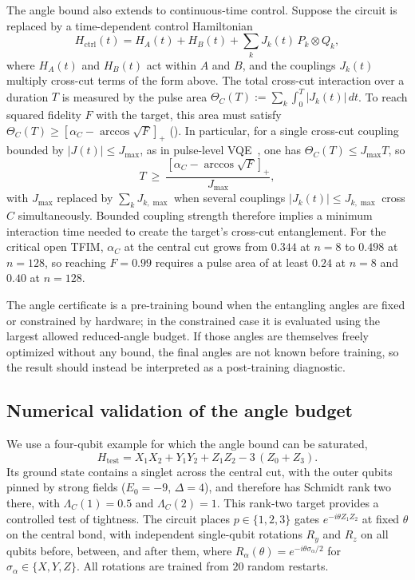 \documentclass[reprint,aps,pra,floatfix,superscriptaddress,nofootinbib,longbibliography]{revtex4-2}
\theoremstyle{remark}
\theoremstyle{definition}
\begin{document}
The angle bound also extends to continuous-time control. Suppose the circuit is
replaced by a time-dependent control Hamiltonian
\begin{equation}
  H_{\mathrm{ctrl}}(t)=H_A(t)+H_B(t)+\sum_kJ_k(t)\,P_k\otimes Q_k ,
\end{equation}
where $H_A(t)$ and $H_B(t)$ act within $A$ and $B$, and the couplings $J_k(t)$
multiply cross-cut terms of the form above. The total cross-cut interaction over
a duration $T$ is measured by the pulse area
$\Theta_C(T):=\sum_k\int_0^T|J_k(t)|\,dt$. To reach squared fidelity $F$ with the
target, this area must satisfy $\Theta_C(T)\ge[\alpha_C-\arccos\sqrt{F}]_+$
(). In particular, for a single cross-cut coupling bounded by
$|J(t)|\le J_{\max}$, as in pulse-level VQE~\cite{meitei2021gatefree}, one has
$\Theta_C(T)\le J_{\max}T$, so
\begin{equation}
  \label{eq:pulsetime}
  T\ \ge\ \frac{[\alpha_C-\arccos\sqrt{F}]_+}{J_{\max}},
\end{equation}
with $J_{\max}$ replaced by $\sum_kJ_{k,\max}$ when several couplings
$|J_k(t)|\le J_{k,\max}$ cross $C$ simultaneously. Bounded coupling strength therefore implies a minimum interaction time needed
to create the target's cross-cut entanglement.
For the critical open TFIM, $\alpha_C$ at the
central cut grows from $0.344$ at $n=8$ to $0.498$ at $n=128$, so reaching
$F=0.99$ requires a pulse area of at least $0.24$ at $n=8$ and $0.40$ at
$n=128$.

The angle certificate is a pre-training bound when the entangling angles are
fixed or constrained by hardware; in the constrained case it is evaluated using the
largest allowed reduced-angle budget. If those angles are themselves freely optimized without
any bound, the final angles are not known before training, so the result should
instead be interpreted as a post-training diagnostic.

\subsection{Numerical validation of the angle budget}

We use a four-qubit example for which the angle bound can be saturated,
\begin{equation}
  \label{eq:Htest}
  H_{\mathrm{test}}=X_1X_2+Y_1Y_2+Z_1Z_2-3\,(Z_0+Z_3).
\end{equation}
Its ground state contains a singlet across the central cut, with the outer qubits
pinned by strong fields ($E_0=-9$, $\Delta=4$), and therefore has Schmidt rank two
there, with $\Lambda_C(1)=0.5$ and $\Lambda_C(2)=1$. This rank-two target
provides a controlled test of tightness. The circuit places $p\in\{1,2,3\}$ gates
$e^{-i\theta Z_1Z_2}$ at fixed $\theta$ on the central bond, with independent
single-qubit rotations $R_y$ and $R_z$ on all qubits before, between, and after
them, where $R_\alpha(\theta)=e^{-i\theta\sigma_\alpha/2}$ for
$\sigma_\alpha\in\{X,Y,Z\}$. All rotations are trained from $20$ random
restarts.
\end{document}

